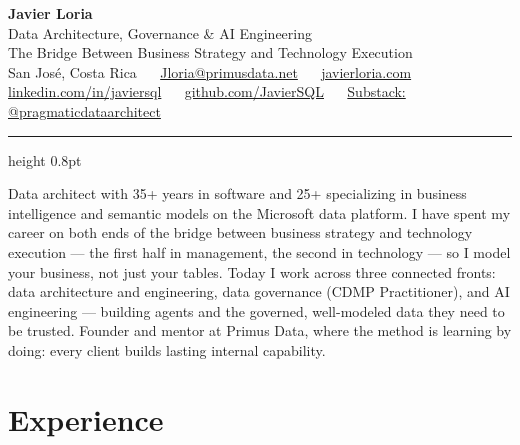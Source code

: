 \documentclass[10.5pt]{article}
\newcommand{\hsep}{\ \raisebox{0.5pt}{\scriptsize\textbullet}\ }
\begin{document}
\begingroup
\centering
{\headingfont\Huge\bfseries Javier Loria}\\[3pt]
{\large\color{accent} Data Architecture, Governance \& AI Engineering}\\[1pt]
{\normalsize\color{accent} The Bridge Between Business Strategy and Technology Execution}\\[6pt]
{\small
San Jos\'e, Costa Rica \hsep
\href{mailto:Jloria@primusdata.net}{Jloria@primusdata.net} \hsep
\href{https://javierloria.com}{javierloria.com}\\[2pt]
\href{https://www.linkedin.com/in/javiersql/}{linkedin.com/in/javiersql} \hsep
\href{https://github.com/JavierSQL}{github.com/JavierSQL} \hsep
\href{https://substack.com/@pragmaticdataarchitect}{Substack: @pragmaticdataarchitect}
}\\[2pt]
\par
\endgroup

\vspace{4pt}
{\color{rule}\hrule height 0.8pt}
\vspace{6pt}

\noindent
Data architect with 35+ years in software and 25+ specializing in business intelligence and semantic models on the Microsoft data platform. I have spent my career on both ends of the bridge between business strategy and technology execution --- the first half in management, the second in technology --- so I model your business, not just your tables. Today I work across three connected fronts: data architecture and engineering, data governance (CDMP Practitioner), and AI engineering --- building agents and the governed, well-modeled data they need to be trusted. Founder and mentor at Primus Data, where the method is learning by doing: every client builds lasting internal capability.

\section*{}
\section{Experience}
\end{document}
